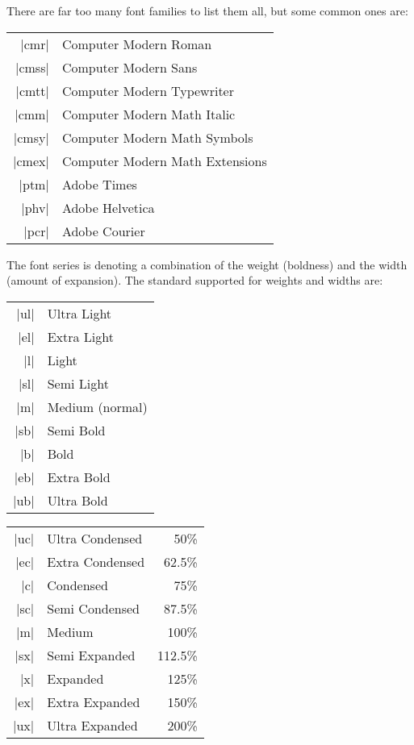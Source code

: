 \documentclass{ltxguide}[1995/11/28]
\begin{document}
There are far too many font families to list them all, but some common
ones are:
\begin{center}
\begin{minipage}{.7\linewidth}
   \begin{tabular}{rl}
      |cmr|  & Computer Modern Roman \\
      |cmss| & Computer Modern Sans \\
      |cmtt| & Computer Modern Typewriter \\
      |cmm|  & Computer Modern Math Italic \\
      |cmsy| & Computer Modern Math Symbols \\
      |cmex| & Computer Modern Math Extensions \\
      |ptm|  & Adobe Times \\
      |phv|  & Adobe Helvetica \\
      |pcr|  & Adobe Courier
   \end{tabular}
\end{minipage}
\end{center}
The font series is denoting a combination of the weight (boldness) and
the width (amount of expansion).  The standard supported for weights
and widths are:
\begin{center}
   \begin{tabular}{rl}
  |ul| &       Ultra Light     \\
  |el| &       Extra Light     \\
  |l|  &       Light          \\
  |sl| &       Semi Light      \\
  |m|  &       Medium (normal)\\
  |sb| &       Semi Bold       \\
  |b|  &       Bold           \\
  |eb| &       Extra Bold      \\
  |ub| &       Ultra Bold      \\
   \end{tabular}
\qquad
   \begin{tabular}{rlr}
       |uc|  &       Ultra Condensed  &  50\%    \\
       |ec|  &       Extra Condensed  &  62.5\%  \\
       |c|   &       Condensed       &  75\%    \\
       |sc|  &       Semi Condensed   &  87.5\%  \\
        |m|  &       Medium          &  100\%   \\
       |sx|  &       Semi Expanded    &  112.5\% \\
        |x|  &       Expanded        &  125\%   \\
       |ex|  &       Extra Expanded   &  150\%   \\
       |ux|  &       Ultra Expanded   &  200\%   \\
   \end{tabular}
\end{center}
\end{document}
